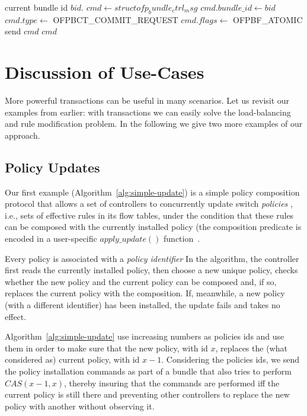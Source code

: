 \documentclass[conference]{sigcomm-alternate}
\begin{document}
\begin{algorithm}[t]
    \caption{$\textit{try-commit}()$}
    \label{alg:commit}
    \begin{algorithmic}[1]
    \Require  current bundle id $bid$.
		    \State $cmd \gets struct ofp_bundle_ctrl_msg$
    		\State  $cmd.bundle\_id \gets bid$
    		\State  $cmd.type \gets $ \textsf{OFPBCT\_COMMIT\_REQUEST} 
    		\State  $cmd.flags \gets $ \textsf{OFPBF\_ATOMIC}
    		\State send $cmd$
		\Return $cmd$
    \end{algorithmic}
\end{algorithm}


\section{Discussion of Use-Cases}\label{sec:apps}

More powerful transactions can be useful in many scenarios.
Let us revisit our examples from earlier: with
transactions we can easily solve the load-balancing
and rule modification problem.
In the following we give two more examples of our approach.

\subsection{Policy Updates}

Our first example (Algorithm~\ref{alg:simple-update}) is a simple policy composition protocol that
allows a set of  controllers to concurrently update switch  \emph{policies} , i.e., sets of
effective rules in its flow tables, under the
condition that these rules can be composed with the currently installed
policy (the composition predicate is encoded in a user-specific
$\textit{apply\_update}()$ function~\cite{cpc}.  

Every policy is associated with a \emph{policy identifier} 
In the algorithm, the controller first reads the currently installed
policy, then choose a new unique policy, checks whether the new
policy and the current policy can be composed and, if so, replaces the
current policy with the composition. If, meanwhile, a new
policy (with a different identifier) has been installed, the update
fails and takes no effect. 

Algorithm~\ref{alg:simple-update} use increasing numbers as policies
ids and use them in order to make sure that the new policy, with id
$x$, replaces the (what considered as) current policy, with id
$x-1$. Considering the policies ids, we send the policy installation
commands as part of a bundle that also tries to perform
$CAS(x-1,x)$, thereby insuring that the commands are
performed iff the current policy is still there and preventing other
controllers to replace the new policy with another without observing it.
\end{document}
